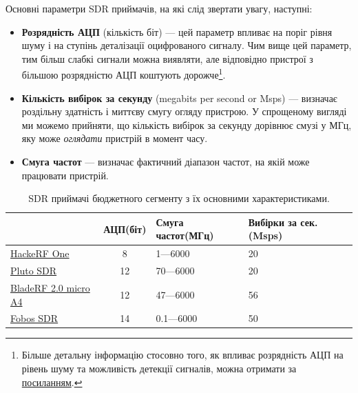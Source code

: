 \documentclass{article}
\begin{document}
Основні параметри SDR приймачів, на які слід звертати увагу, наступні:

\begin{itemize}[noitemsep, topsep=8pt]
\item \textbf{Розрядність АЦП} (кількість біт) --- цей параметр впливає на поріг рівня шуму і на ступінь деталізації оцифрованого сигналу. Чим вище цей параметр, тим більш слабкі сигнали можна виявляти, але відповідно пристрої з більшою розрядністю АЦП коштують дорожче\footnote{Більше детальну інформацію стосовно того, як впливає розрядність АЦП на рівень шуму та можливість детекції сигналів, можна отримати за \href{https://en.wikipedia.org/wiki/Quantization_(signal_processing)}{посиланням}.}.
\item \textbf{Кількість вибірок за секунду} (megabits per second or Msps) --- визначає роздільну здатність і миттєву смугу огляду пристрою. У спрощеному вигляді ми можемо прийняти, що кількість вибірок за секунду дорівнює смузі у МГц, яку може \textit{оглядати} пристрій в момент часу.
\item \textbf{Смуга частот} --- визначає фактичний діапазон частот, на якій може працювати пристрій. 
\end{itemize}
 
\begin{table}[h]
\centering
\begin{tabular}{|l|c|l|l|l|}
\hline
\textbf{} & \textbf{АЦП(біт)} & \textbf{Смуга частот(МГц)} & \textbf{Вибірки за сек.(Msps)} \\ \hline
\href{https://greatscottgadgets.com/hackrf/one/}{HackeRF One}  & 8  & 1---6000  & 20  \\ \hline
\href{https://www.analog.com/en/resources/evaluation-hardware-and-software/evaluation-boards-kits/adalm-pluto.html}{Pluto SDR}    & 12 & 70---6000 & 20 \\ \hline
\href{https://www.nuand.com/bladerf-2-0-micro/}{BladeRF 2.0 micro A4} & 12 & 47---6000 & 56   \\ \hline
\href{https://rigexpert.com/uk/products/programno-viznachene-radio-sdr/fobos-sdr/}{Fobos SDR} & 14 & 0.1---6000 & 50  \\ \hline
\end{tabular}
\caption{SDR приймачі бюджетного сегменту з їх основними характеристиками.}
\label{tab:sample}
\end{table}
\end{document}
